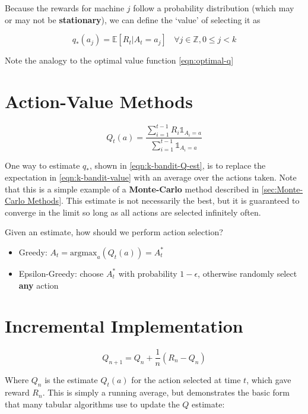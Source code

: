 \documentclass[11pt]{report}
\begin{document}
Because the rewards for machine $j$ follow a probability distribution (which may or may not be \textbf{stationary}), we can define the `value' of selecting it as

\begin{equation}
	\label{eqn:k-bandit-value}
	q_\ast(a_j) = \mathbb{E}[R_t | A_t = a_j] \ \ \ \ \forall j \in \mathbb{Z}, 0 \leq j < k
\end{equation}

Note the analogy to the optimal value function \autoref{eqn:optimal-q}

\section{Action-Value Methods}\label{par:Action-Value Methods}

\begin{equation}
	\label{eqn:k-bandit-Q-est}
	Q_t(a) = \frac{\sum_{i=1}^{t-1} R_i \mathbb{1}_{A_i=a}}{\sum_{i=1}^{t-1}\mathbb{1}_{A_i=a}}
\end{equation}

One way to estimate $q_\ast$, shown in \autoref{eqn:k-bandit-Q-est}, is to replace the expectation in \autoref{eqn:k-bandit-value} with an average over the actions taken. Note that this is a simple example of a \textbf{Monte-Carlo} method described in \autoref{sec:Monte-Carlo Methods}. This estimate is not necessarily the best, but it is guaranteed to converge in the limit so long as all actions are selected infinitely often.

Given an estimate, how should we perform action selection?
\begin{itemize}
	\item Greedy: $A_t = \text{argmax}_{a}(Q_t(a)) = A_t^\ast$
	\item Epsilon-Greedy: choose $A_t^\ast$ with probability $1-\epsilon$, otherwise randomly select \textbf{any} action
\end{itemize}

\section{Incremental Implementation}\label{par:Incremental Implementation}
\begin{equation}
	\label{eqn:k-bandit-incremental-implementation}
	Q_{n+1} = Q_{n} + \frac{1}{n}\left(R_n - Q_n\right)
\end{equation}

Where $Q_{n}$ is the estimate $Q_t(a)$ for the action selected at time $t$, which gave reward $R_n$. This is simply a running average, but demonstrates the basic form that many tabular algorithms use to update the $Q$ estimate:
\end{document}

